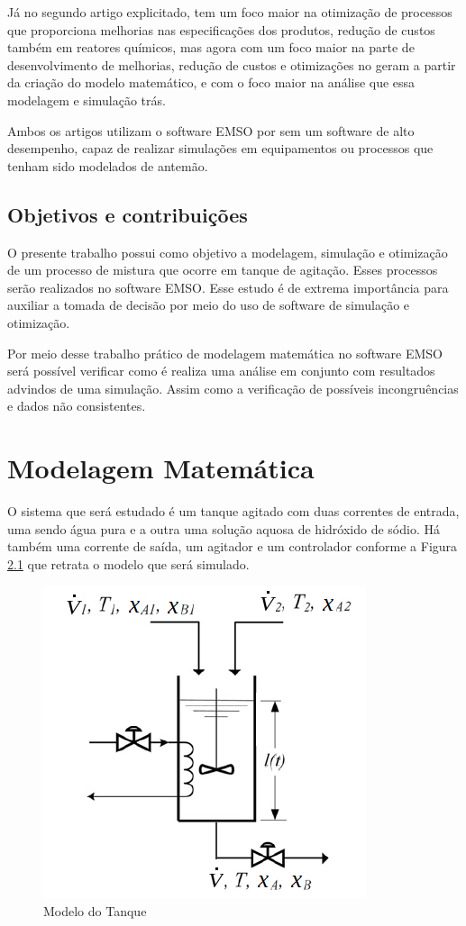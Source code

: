 \documentclass[
	12pt,				%
	openright,			%
	oneside,			%
	a4paper,			%
	english,			%
	french,				%
	spanish,			%
	brazil				%
	]{abntex2}
\begin{document}
Já no segundo artigo explicitado, tem um foco maior na otimização de processos que proporciona melhorias nas especificações dos produtos, redução de custos também em reatores químicos, mas agora com um foco maior na parte de desenvolvimento de melhorias, redução de custos e otimizações no geram a partir da criação do modelo matemático, e com o foco maior na análise que essa modelagem e simulação trás.
	
Ambos os artigos utilizam o software EMSO por sem um software de alto desempenho, capaz de realizar simulações em equipamentos ou processos que tenham sido modelados de antemão.

\section{Objetivos e contribuições}

O presente trabalho possui como objetivo a modelagem, simulação e otimização de um processo de mistura que ocorre em tanque de agitação. Esses processos serão realizados no software EMSO. Esse estudo é de extrema importância para auxiliar a tomada de decisão por meio do uso de software de simulação e otimização. 

Por meio desse trabalho prático de modelagem matemática no software EMSO será possível verificar como é realiza uma análise em conjunto com resultados advindos de uma simulação. Assim como a verificação de possíveis incongruências e dados não consistentes.

\newpage
\chapter{Modelagem Matemática}
\pagestyle{fancy}

O sistema que será estudado é um tanque agitado com duas correntes de entrada, uma sendo água pura e a outra uma solução aquosa de hidróxido de sódio. Há também uma corrente de saída, um agitador e um controlador conforme a Figura \ref{Modelo do Tanque} que retrata o modelo que será simulado.

\begin{figure}[!h]
\centering
\includegraphics[scale=0.6]{1a.png} 
\caption{Modelo do Tanque}
\label{Modelo do Tanque}
\end{figure}
\end{document}
